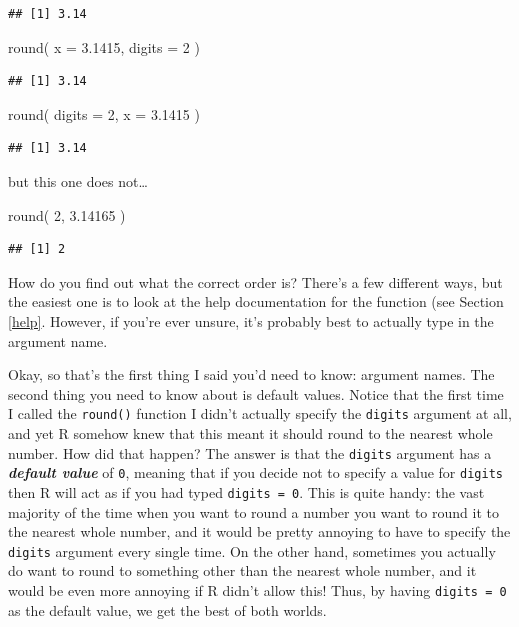 \documentclass[
]{book}
\newenvironment{Shaded}{\begin{snugshade}}{\end{snugshade}}
\newcommand{\AttributeTok}[1]{\textcolor[rgb]{0.77,0.63,0.00}{#1}}
\newcommand{\DecValTok}[1]{\textcolor[rgb]{0.00,0.00,0.81}{#1}}
\newcommand{\FloatTok}[1]{\textcolor[rgb]{0.00,0.00,0.81}{#1}}
\newcommand{\FunctionTok}[1]{\textcolor[rgb]{0.00,0.00,0.00}{#1}}
\newcommand{\NormalTok}[1]{#1}
\begin{document}
\begin{verbatim}
## [1] 3.14
\end{verbatim}

\begin{Shaded}
\begin{Highlighting}[]
\FunctionTok{round}\NormalTok{( }\AttributeTok{x =} \FloatTok{3.1415}\NormalTok{, }\AttributeTok{digits =} \DecValTok{2}\NormalTok{ )}
\end{Highlighting}
\end{Shaded}

\begin{verbatim}
## [1] 3.14
\end{verbatim}

\begin{Shaded}
\begin{Highlighting}[]
\FunctionTok{round}\NormalTok{( }\AttributeTok{digits =} \DecValTok{2}\NormalTok{, }\AttributeTok{x =} \FloatTok{3.1415}\NormalTok{ )}
\end{Highlighting}
\end{Shaded}

\begin{verbatim}
## [1] 3.14
\end{verbatim}

but this one does not\ldots{}

\begin{Shaded}
\begin{Highlighting}[]
\FunctionTok{round}\NormalTok{( }\DecValTok{2}\NormalTok{, }\FloatTok{3.14165}\NormalTok{ )}
\end{Highlighting}
\end{Shaded}

\begin{verbatim}
## [1] 2
\end{verbatim}

How do you find out what the correct order is? There's a few different ways, but the easiest one is to look at the help documentation for the function (see Section \ref{help}. However, if you're ever unsure, it's probably best to actually type in the argument name.

Okay, so that's the first thing I said you'd need to know: argument names. The second thing you need to know about is default values. Notice that the first time I called the \texttt{round()} function I didn't actually specify the \texttt{digits} argument at all, and yet R somehow knew that this meant it should round to the nearest whole number. How did that happen? The answer is that the \texttt{digits} argument has a \textbf{\emph{default value}} of \texttt{0}, meaning that if you decide not to specify a value for \texttt{digits} then R will act as if you had typed \texttt{digits\ =\ 0}. This is quite handy: the vast majority of the time when you want to round a number you want to round it to the nearest whole number, and it would be pretty annoying to have to specify the \texttt{digits} argument every single time. On the other hand, sometimes you actually do want to round to something other than the nearest whole number, and it would be even more annoying if R didn't allow this! Thus, by having \texttt{digits\ =\ 0} as the default value, we get the best of both worlds.
\end{document}
